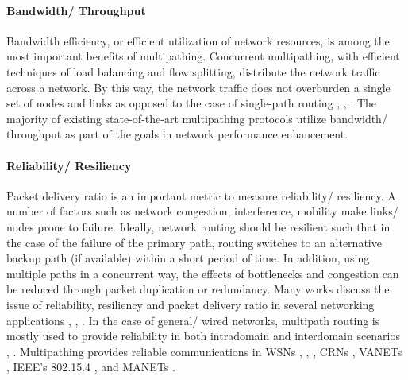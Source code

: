\documentclass[10pt]{IEEEtran}
\begin{document}
\vspace{2mm}
\paragraph{Bandwidth/ Throughput}
\label{subsec:BW}

Bandwidth efficiency, or efficient utilization of network resources, is among the most important benefits of multipathing. Concurrent multipathing, with efficient techniques of load balancing and flow splitting, distribute the network traffic across a network. By this way, the network traffic does not overburden a single set of nodes and links as opposed to the case of single-path routing \cite{phatak2002novel}, \cite{maxemchuk1975}, \cite{villamizar1999ospf}. The majority of existing state-of-the-art multipathing protocols utilize bandwidth/ throughput as part of the goals in network performance enhancement. 



\vspace{2mm}
\paragraph{Reliability/ Resiliency}
\label{subsec:reliability}

Packet delivery ratio is an important metric to measure reliability/ resiliency. A number of factors such as network congestion, interference, mobility make links/ nodes prone to failure. Ideally, network routing should be resilient such that in the case of the failure of the primary path, routing switches to an alternative backup path (if available) within a short period of time. In addition, using multiple paths in a concurrent way, the effects of bottlenecks and congestion can be reduced through packet duplication or redundancy. Many works discuss the issue of reliability, resiliency and packet delivery ratio in several networking applications \cite{andersen2005improving}, \cite{xu2006miro}, \cite{kushman2007r}. In the case of general/ wired networks, multipath routing is mostly used to provide reliability in both intradomain and interdomain scenarios \cite{yang2007nira}, \cite{godfrey2009pathlet}. Multipathing provides reliable communications in WSNs \cite{felemban2006mmspeed}, \cite{ming2007energy}, \cite{huang2008multiconstrained}, CRNs \cite{beltagy2011new}, VANETs  \cite{huang2009performance}, IEEE's 802.15.4 \cite{pavkovic2011multipath}, and MANETs \cite{ye2003framework, valera2003cooperative, lou2004spread, li2004demand, chen2005multipath}. 
\end{document}
